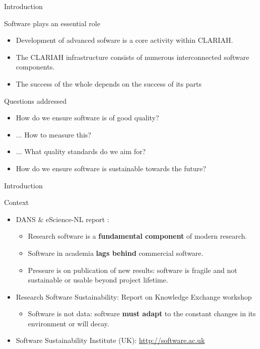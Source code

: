 \documentclass[compress]{beamer}
\begin{document}
\begin{frame}{Introduction}
    \begin{block}{Software plays an essential role}
        \begin{itemize}
            \item Development of advanced sofware is a core activity within CLARIAH.
            \item The CLARIAH infrastructure consists of numerous interconnected software components.
            \item The success of the whole depends on the success of its parts
        \end{itemize}
    \end{block}

    \begin{block}{Questions addressed}
        \begin{itemize}
            \item How do we ensure software is of good quality?
            \item ... How to measure this?
            \item ... What quality standards do we aim for?
            \item How do we ensure software is sustainable towards the future?
        \end{itemize}
    \end{block}

\end{frame}

\begin{frame}{Introduction}
    \begin{block}{Context}
        \begin{itemize}
        \item DANS \& eScience-NL report \citep{RESEARCHSOFTWARE}:
        \begin{itemize}
            \item Research software is a \textbf{fundamental component} of modern research.
            \item Software in academia \textbf{lags behind} commercial software.
            \item Pressure is on publication of new results: software is fragile
                and not sustainable or usable beyond project lifetime.
        \end{itemize}
        \item Research Software Sustainability: Report on Knowledge Exchange workshop
        \begin{itemize}
            \item Software is not data: software \textbf{must adapt} to the constant changes in its environment or will decay.
        \end{itemize}
        \item Software Sustainability Institute (UK): \url{http://software.ac.uk}
        \end{itemize}
    \end{block}
\end{frame}
\end{document}
